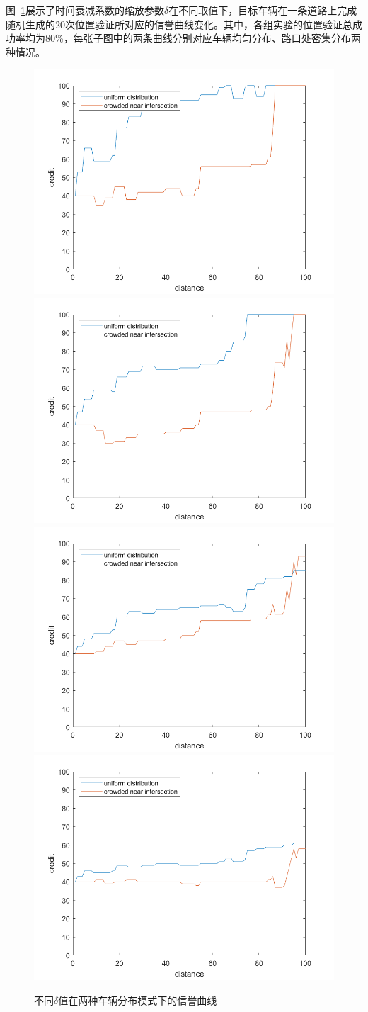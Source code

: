 图~\ref{fig:decay}展示了时间衰减系数的缩放参数$\delta$在不同取值下，目标车辆在一条道路上完成随机生成的20次位置验证所对应的信誉曲线变化。其中，各组实验的位置验证总成功率均为80\%，每张子图中的两条曲线分别对应车辆均匀分布、路口处密集分布两种情况。

\begin{figure}
  \centering
    {\includegraphics[width=0.49\linewidth]{figures/decay01.png}}
    {\includegraphics[width=0.49\linewidth]{figures/decay02.png}}
    {\includegraphics[width=0.49\linewidth]{figures/decay03.png}}
    {\includegraphics[width=0.49\linewidth]{figures/decay05.png}}
  \caption{不同$\delta$值在两种车辆分布模式下的信誉曲线}
  \label{fig:decay}
\end{figure}


